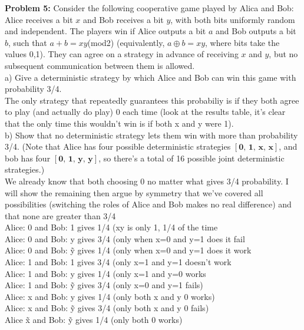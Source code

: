 \textbf{Problem 5:} Consider the following cooperative game played by Alica and
Bob: Alice receives a bit $x$ and Bob receives a bit $y$, with both bits uniformly
random and independent. The players win if Alice outputs a bit $a$ and Bob outputs a bit $b$, such that $a+b= xy$(mod2) (equivalently, $a\oplus b=xy$, where bits take the values 0,1). They can agree on a strategy in
advance of receiving $x$ and $y$, but no subsequent communication between them is
allowed.\\

a) Give a deterministic strategy by which Alice and Bob can win this game with
probability 3/4.\\

The only strategy that repeatedly guarantees this probabiliy is if they both
agree to play (and actually do play) 0 each time (look at the results table,
it's clear that the only time this wouldn't win is if both x and y were 1).\\

b) Show that no deterministic strategy lets them win with more than probability
3/4.
(Note that Alice has four possible deterministic strategies
$[\textbf{0,~1,~x,~\~x}]$, and bob has four $[\textbf{0,~1,~y,~\~y}]$, so
there's a total of 16 possible joint deterministic strategies.)\\

We already know that both choosing 0 no matter what gives 3/4 probability. I
will show the remaining then argue by symmetry that we've covered all
possibilities (switching the roles of Alice and Bob makes no real difference) and that none are greater than 3/4\\

Alice: 0 and Bob: 1 gives 1/4 (xy is only 1, 1/4 of the time\\
Alice: 0 and Bob: y gives 3/4 (only when x=0 and y=1 does it fail\\
Alice: 0 and Bob: \~y gives 1/4 (only when x=0 and y=1 does it work\\
Alice: 1 and Bob: 1 gives 3/4 (only x=1 and y=1 doesn't work\\
Alice: 1 and Bob: y gives  1/4 (only x=1 and y=0 works\\
Alice: 1 and Bob: \~y gives 3/4 (only x=0 and y=1 fails)\\
Alice: x and Bob: y gives 1/4 (only both x and y 0 works)\\
Alice: x and Bob: \~y gives 3/4 (only both x and y 0 fails)\\
Alice \~x and Bob: \~y gives 1/4 (only both 0 works)\\

